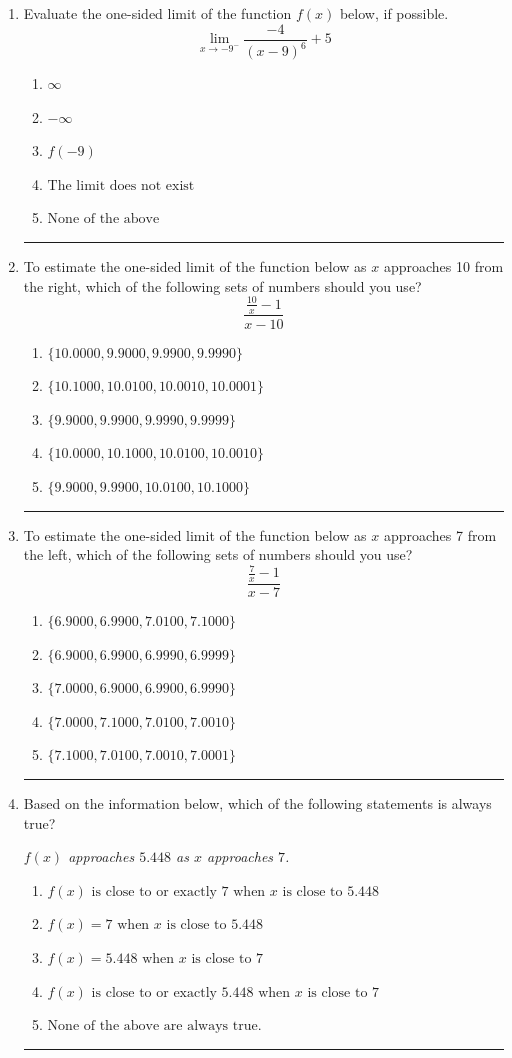 \documentclass[14pt]{extbook}
\newcommand{\litem}[1]{\item#1\hspace*{-1cm}\rule{\textwidth}{0.4pt}}
\begin{document}
\begin{enumerate}
{\begin{enumerate}[label=\Alph*.]
\end{enumerate} }
\litem{
Evaluate the one-sided limit of the function $f(x)$ below, if possible.\[ \lim_{x \rightarrow -9^-} \frac{-4}{(x-9)^6}+5 \]\begin{enumerate}[label=\Alph*.]
\item \( \infty \)
\item \( -\infty \)
\item \( f(-9) \)
\item \( \text{The limit does not exist} \)
\item \( \text{None of the above} \)

\end{enumerate} }
\litem{
To estimate the one-sided limit of the function below as $x$ approaches 10 from the right, which of the following sets of numbers should you use?\[ \frac{\frac{10}{x} - 1}{x - 10} \]\begin{enumerate}[label=\Alph*.]
\item \( \{ 10.0000, 9.9000, 9.9900, 9.9990 \} \)
\item \( \{ 10.1000, 10.0100, 10.0010, 10.0001 \} \)
\item \( \{ 9.9000, 9.9900, 9.9990, 9.9999 \} \)
\item \( \{ 10.0000, 10.1000, 10.0100, 10.0010 \} \)
\item \( \{ 9.9000, 9.9900, 10.0100, 10.1000 \} \)

\end{enumerate} }
\litem{
To estimate the one-sided limit of the function below as $x$ approaches 7 from the left, which of the following sets of numbers should you use?\[ \frac{\frac{7}{x} - 1}{x - 7} \]\begin{enumerate}[label=\Alph*.]
\item \( \{ 6.9000, 6.9900, 7.0100, 7.1000 \} \)
\item \( \{ 6.9000, 6.9900, 6.9990, 6.9999 \} \)
\item \( \{ 7.0000, 6.9000, 6.9900, 6.9990 \} \)
\item \( \{ 7.0000, 7.1000, 7.0100, 7.0010 \} \)
\item \( \{ 7.1000, 7.0100, 7.0010, 7.0001 \} \)

\end{enumerate} }
\litem{
Based on the information below, which of the following statements is always true?
\begin{center}
    \textit{ $f(x)$ approaches $5.448$ as $x$ approaches $7$. }
\end{center}
\begin{enumerate}[label=\Alph*.]
\item \( f(x) \text{ is close to or exactly } 7 \text{ when } x \text{ is close to } 5.448 \)
\item \( f(x) = 7 \text{ when } x \text{ is close to } 5.448 \)
\item \( f(x) = 5.448 \text{ when } x \text{ is close to } 7 \)
\item \( f(x) \text{ is close to or exactly } 5.448 \text{ when } x \text{ is close to } 7 \)
\item \( \text{None of the above are always true.} \)


\end{enumerate}}
\end{enumerate}
\end{document}
